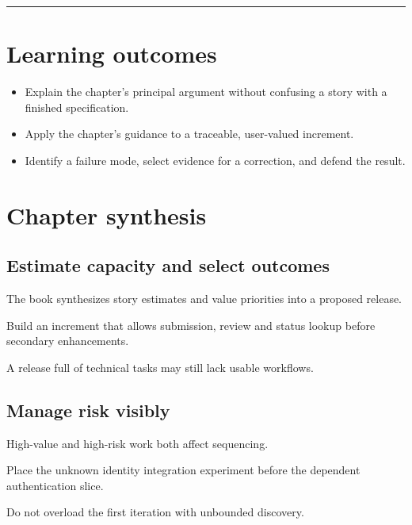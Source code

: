 \documentclass[11pt,letterpaper]{article}
\begin{document}
\tableofcontents\medskip\noindent\rule{\linewidth}{0.4pt}\medskip
\section{Learning outcomes}
\begin{itemize}[leftmargin=*,itemsep=2pt]
\item Explain the chapter's principal argument without confusing a story with a finished specification.
\item Apply the chapter's guidance to a traceable, user-valued increment.
\item Identify a failure mode, select evidence for a correction, and defend the result.
\end{itemize}
\section{Chapter synthesis}
\subsection{Estimate capacity and select outcomes}
The book synthesizes story estimates and value priorities into a proposed release.

\begin{tcolorbox}[colback=tealback,colframe=navy,title={Engineering translation},breakable]
Build an increment that allows submission, review and status lookup before secondary enhancements.

\end{tcolorbox}
\begin{tcolorbox}[colback=amberback,colframe=navy,title={Failure mode to watch},breakable]
A release full of technical tasks may still lack usable workflows.

\end{tcolorbox}
\subsection{Manage risk visibly}
High-value and high-risk work both affect sequencing.

\begin{tcolorbox}[colback=tealback,colframe=navy,title={Engineering translation},breakable]
Place the unknown identity integration experiment before the dependent authentication slice.

\end{tcolorbox}
\begin{tcolorbox}[colback=amberback,colframe=navy,title={Failure mode to watch},breakable]
Do not overload the first iteration with unbounded discovery.

\end{tcolorbox}
\end{document}
